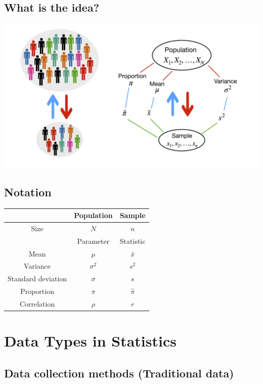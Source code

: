 \documentclass[
]{article}
\begin{document}
\hypertarget{what-is-the-idea}{%
\subsection{What is the idea?}\label{what-is-the-idea}}

\begin{center}\includegraphics[width=0.65\linewidth,height=0.65\textheight]{stat1new} \end{center}

\hypertarget{notation}{%
\subsection{Notation}\label{notation}}

\begin{longtable}[]{@{}ccc@{}}
\toprule()
~ & Population & Sample \\
\midrule()
\endhead
Size & \(N\) & \(n\) \\
& Parameter & Statistic \\
Mean & \(\mu\) & \(\bar{x}\) \\
Variance & \(\sigma^2\) & \(s^2\) \\
Standard deviation & \(\sigma\) & \(s\) \\
Proportion & \(\pi\) & \(\hat{\pi}\) \\
Correlation & \(\rho\) & \(r\) \\
\bottomrule()
\end{longtable}

\pagebreak

\hypertarget{data-types-in-statistics}{%
\section{Data Types in Statistics}\label{data-types-in-statistics}}

\hypertarget{data-collection-methods-traditional-data}{%
\subsection{Data collection methods (Traditional
data)}\label{data-collection-methods-traditional-data}}
\end{document}
